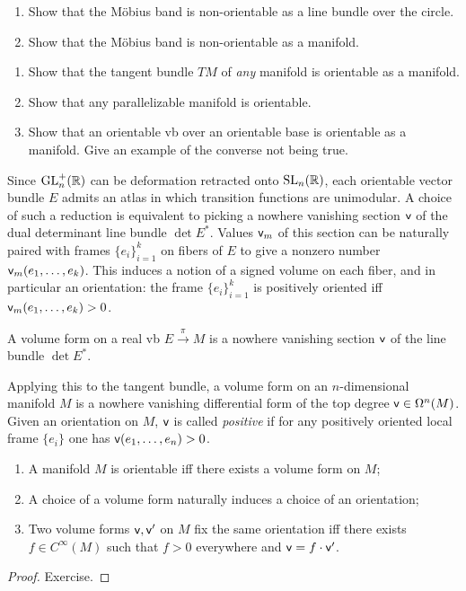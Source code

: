 \begin{xca}
\begin{enumerate}
    \item Show that the M\"obius band is non-orientable as a line bundle over the circle.
    \item Show that the M\"obius band is non-orientable as a manifold.
\end{enumerate}
\end{xca}

\begin{xca}
\begin{enumerate}
    \item Show that the tangent bundle $TM$ of \emph{any} manifold is orientable as a manifold.
    \item Show that any parallelizable manifold is orientable.
    \item Show that an orientable \gls{vb} over an orientable base is orientable as a manifold. Give an example of the converse not being true.
\end{enumerate}
\end{xca}

Since $\operatorname{GL}^+_n(\mathbb{R})$ can be deformation retracted onto $\operatorname{SL}_n(\mathbb{R})$, each orientable vector bundle $E$ admits an atlas in which transition functions are unimodular. A choice of such a reduction is equivalent to picking a nowhere vanishing section $\mathsf{v}$ of the dual determinant line bundle $\det E^\ast$. Values $\mathsf{v}_m$ of this section can be naturally paired with frames $\{e_i\}_{i=1}^k$ on fibers of $E$ to give a nonzero number $\mathsf{v}_m(e_1,\ldots,e_k)$. This induces a notion of a signed volume on each fiber, and in particular an orientation: the frame $\{e_i\}_{i=1}^k$ is positively oriented iff $\mathsf{v}_m(e_1,\ldots,e_k)>0$.

\begin{defn}
    A volume form on a real \gls{vb} $E\overset{\pi}{\to} M$ is a nowhere vanishing section $\mathsf{v}$ of the line bundle $\det E^\ast$. 

    Applying this to the tangent bundle, a volume form on an $n$-dimensional manifold $M$ is a nowhere vanishing differential form of the top degree $\mathsf{v}\in \Omega^n(M)$. Given an orientation on $M$, $\mathsf{v}$ is called \emph{positive} if for any positively oriented local frame $\{e_i\}$ one has $\mathsf{v}(e_1,\ldots,e_n)>0$.
\end{defn}

\begin{prop}
\begin{enumerate}
    \item A manifold $M$ is orientable iff there exists a volume form on $M$;
    \item A choice of a volume form naturally induces a choice of an orientation;
    \item Two volume forms $\mathsf{v},\mathsf{v}'$ on $M$ fix the same orientation iff there exists $f\in C^\infty(M)$ such that $f>0$ everywhere and $\mathsf{v}=f\cdot \mathsf{v}'$. 
\end{enumerate}
\end{prop}
\begin{proof}
Exercise.
\end{proof}


